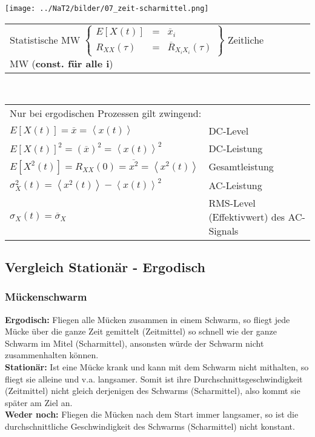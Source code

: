 	\begin{minipage}{5cm}
		\texttt{[image: ../NaT2/bilder/07\_zeit-scharmittel.png]}
  	\end{minipage}
	\begin{minipage}{13.5cm}
	\begin{tabular}{llll}  
    	Statistische MW $ \left\{
    	\begin{array}{ccc}
       		E[X(t)] & = & \overline{x}_i \\
       		R_{XX}(\tau) & = & \overline{R}_{X_iX_i}(\tau)
       \end{array}
		\right\} $
		Zeitliche MW (\textbf{const. für alle i})
    \end{tabular} \\

	\begin{tabular}{ll}
  		\multicolumn{2}{l}{Nur bei ergodischen Prozessen gilt zwingend:} \\
      $E[X(t)] = \overline{x} = \left\langle x(t) \right\rangle$ & DC-Level \\
      $E[X(t)]^{2} = (\overline{x})^{2} = \left\langle x(t) \right\rangle^{2}$ & DC-Leistung \\
      $E[X^{2}(t)] = R_{XX}(0) = \overline{x^{2}} = 
                     \left\langle x^{2}(t) \right\rangle $ & Gesamtleistung \\
      $\sigma_{X}^{2}(t) = \left\langle x^{2}(t) \right\rangle 
                           - \left\langle x(t) \right\rangle^{2}$ & AC-Leistung \\
      $\sigma_{X}(t) = \overline{\sigma}_{X}$ & RMS-Level (Effektivwert) des AC-Signals\\
    \end{tabular}
  	\end{minipage}


\subsection{Vergleich Stationär - Ergodisch}
\subsubsection{Mückenschwarm}
\textbf{Ergodisch:} Fliegen alle Mücken zusammen in einem Schwarm, so fliegt jede Mücke über die
ganze Zeit gemittelt (Zeitmittel) so schnell wie der ganze Schwarm im Mitel (Scharmittel), ansonsten
würde der Schwarm nicht zusammenhalten können. \\
\textbf{Stationär:} Ist eine Mücke krank und kann mit dem Schwarm nicht mithalten, so fliegt sie
alleine und v.a. langsamer. Somit ist ihre Durchschnittsgeschwindigkeit (Zeitmittel) nicht gleich
derjenigen des Schwarms (Scharmittel), also kommt sie später am Ziel an. \\
\textbf{Weder noch:} Fliegen die Mücken nach dem Start immer langsamer, so ist die
durchschnittliche Geschwindigkeit des Schwarms (Scharmittel) nicht konstant.

